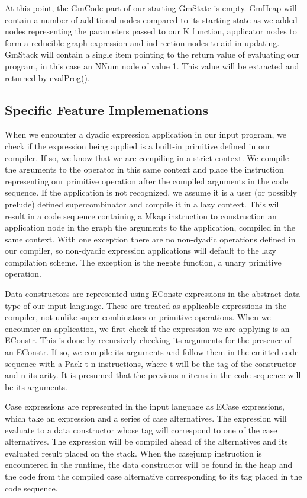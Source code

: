 At this point, the GmCode part of our starting GmState is empty.
GmHeap will contain a number of additional nodes compared to its
starting state as we added nodes representing the parameters passed
to our K function, applicator nodes to form a reducible graph 
expression and indirection nodes to aid in updating. GmStack will
contain a single item pointing to the return value of evaluating
our program, in this case an NNum node of value 1. This value will
be extracted and returned by evalProg().

\subsection{Specific Feature Implemenations}
When we encounter a dyadic expression application in our input
program, we check if the expression being applied is a built-in
primitive defined in our compiler. If so, we know that we are
compiling in a strict context. We compile the arguments to the
operator in this same context and place the instruction 
representing our primitive operation after the compiled arguments
in the code sequence. If the application is not recognized, we
assume it is a user (or possibly prelude) defined supercombinator
and compile it in a lazy context. This will result in a code
sequence containing a Mkap instruction to construction an application
node in the graph the arguments to the application, compiled in the
same context. With one exception there are no non-dyadic operations
defined in our compiler, so non-dyadic expression applications
will default to the lazy compilation scheme. The exception is
the negate function, a unary primitive operation.

Data constructors are represented using EConstr expressions in 
the abstract data type of our input language. These are treated
as applicable expressions in the compiler, not unlike super 
combinators or primitive operations. When we encounter an 
application, we first check if the expression we are applying
is an EConstr. This is done by recursively checking its arguments
for the presence of an EConstr. If so, we compile its arguments 
and follow them in the emitted code sequence with a Pack t n 
instructions, where t will be the tag of the constructor and n 
its arity. It is presumed that the previous n items in the code 
sequence will be its arguments. 

Case expressions are represented in the input language as ECase
expressions, which take an expression and a series of case 
alternatives. The expression will evaluate to a data constructor
whose tag will correspond to one of the case alternatives. The 
expression will be compiled ahead of the alternatives and its
evaluated result placed on the stack. When the casejump instruction 
is encountered in the runtime, the data constructor will be 
found in the heap and the code from the compiled case alternative
corresponding to its tag placed in the code sequence.


